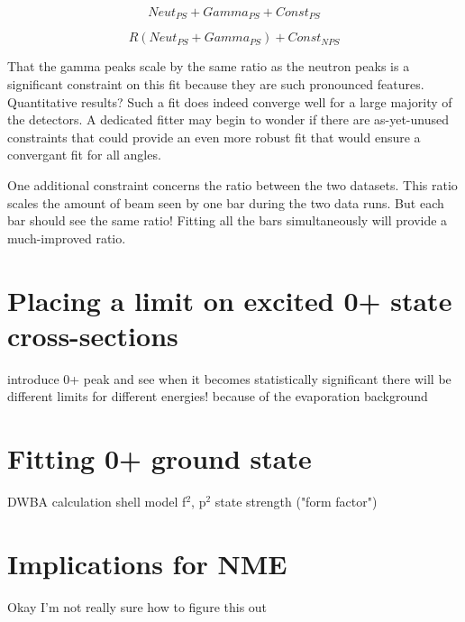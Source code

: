 \begin{equation}
Neut_{PS} + Gamma_{PS} + Const_{PS}
\end{equation}

\begin{equation}
R(Neut_{PS} + Gamma_{PS}) + Const_{NPS}
\end{equation}

That the gamma peaks scale by the same ratio as the neutron peaks is a significant constraint on this fit because they are such pronounced features.  Quantitative results?  Such a fit does indeed converge well for a large majority of the detectors.  A dedicated fitter may begin to wonder if there are as-yet-unused constraints that could provide an even more robust fit that would ensure a convergant fit for all angles.

One additional constraint concerns the ratio between the two datasets.  This ratio scales the amount of beam seen by one bar during the two data runs.  But each bar should see the same ratio!  Fitting all the bars simultaneously will provide a much-improved ratio.




\section{Placing a limit on excited 0+ state cross-sections}
introduce 0+ peak and see when it becomes statistically significant
there will be different limits for different energies!  because of the evaporation background

\section{Fitting 0+ ground state}
DWBA calculation
shell model
f$^2$, p$^2$ state strength ("form factor")

\section{Implications for \zvbb NME}
Okay I'm not really sure how to figure this out

%
% 
% 
